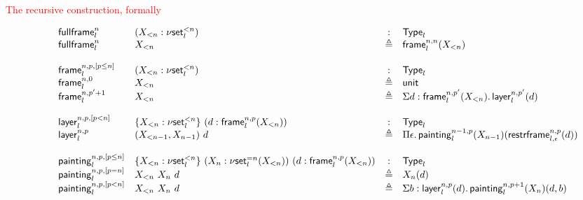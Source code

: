 \documentclass[12pt,landscape]{article}
\newcommand{\sort}[1]{\mathsf{Type}_{#1}}
\newcommand{\defeq}{\triangleq}
\newcommand{\partialcubset}[2]{\mathsf{\nu set}_{#1}^{<#2}}
\newcommand{\mycubsetcomp}[2]{\mathsf{\nu set}_{#1}^{=#2}}
\newcommand{\mybox}[1]{\mathsf{frame}_{#1}}
\newcommand{\mylayer}[1]{\mathsf{layer}_{#1}}
\newcommand{\mycube}[1]{\mathsf{painting}_{#1}}
\newcommand{\myfullbox}[1]{\mathsf{fullframe}_{#1}}
\newcommand{\unittype}{\mathsf{unit}}
\newcommand{\downbox}[2]{\mathsf{restrframe}_{#1,#2}}
\begin{document}
\begin{LARGE}
\begin{sf}
\begin{center}
\textcolor{red}{\huge The recursive construction, formally}
\end{center}
\vspace{-1mm}
\begin{large}
$$
\hspace{8mm}
\begin{array}{llcl}
\myfullbox{l}^{n} & (X_{<n}:\partialcubset{l}{n}) & : & \sort{l}\\
\myfullbox{l}^{n} & X_{<n} & \defeq & \mybox{l}^{n,n}(X_{<n})\\
\\
\mybox{l}^{n,p,[p \leq n]} & (X_{<n}:\partialcubset{l}{n}) & : & \sort{l}\\
\mybox{l}^{n,0} & X_{<n} & \defeq & \unittype\\
\mybox{l}^{n,p'+1} & X_{<n} & \defeq & \Sigma d:\mybox{l}^{n,p'}(X_{<n}).\,\mylayer{l}^{n,p'}(d)\\
\\
\mylayer{l}^{n,p,[p < n]} & \!\!\!\begin{array}{l}\{X_{<n}:\partialcubset{l}{n}\}~(d:\mybox{l}^{n,p}(X_{<n}))\end{array}& : & \sort{l}\\
\mylayer{l}^{n,p} & (X_{<n-1},X_{n-1})~d & \defeq & \Pi \epsilon.\,\mycube{l}^{n-1,p}(X_{n-1})(\downbox{l}{\epsilon}^{n,p}(d))\\
\\
\mycube{l}^{n,p,[p \leq n]} & \!\!\!\begin{array}{l}\{X_{<n}:\partialcubset{l}{n}\}~(X_n:\mycubsetcomp{l}{n}(X_{<n}))~(d:\mybox{l}^{n,p}(X_{<n}))\end{array}\!\!\! & : & \sort{l}\\
\mycube{l}^{n,p,[p = n]} & X_{<n}~X_n~d & \defeq & X_n(d)\\
\mycube{l}^{n,p,[p < n]} & X_{<n}~X_n~d & \defeq & \Sigma b:\mylayer{l}^{n,p}(d).\,\mycube{l}^{n,p+1}(X_n)(d,b)\\
\end{array}
$$
\end{large}

\bigskip


\end{sf}
\end{LARGE}
\end{document}
